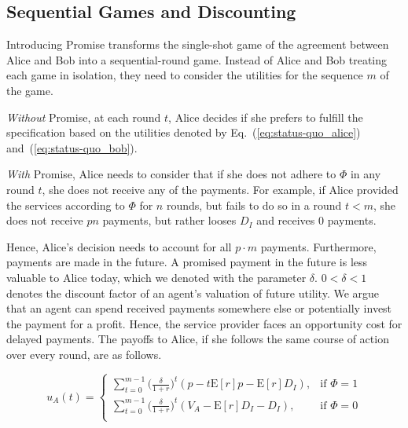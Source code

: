 \documentclass[runningheads]{llncs}
\newcommand{\sys}{Promise\xspace}
\newcommand{\rk}[1]{\todo[linecolor=red,backgroundcolor=red!25,bordercolor=blue,inline,caption={}]{Comment by Rami: #1}}
\begin{document}
\subsection{Sequential Games and Discounting}
Introducing \sys transforms the single-shot game of the agreement between Alice and Bob into a sequential-round game.
Instead of Alice and Bob treating each game in isolation, they need to consider the utilities for the sequence $m$ of the game.

\emph{Without} \sys, at each round $t$, Alice decides if she prefers to fulfill the specification based on the utilities denoted by Eq.~(\ref{eq:status-quo_alice}) and~(\ref{eq:status-quo_bob}).

\emph{With} \sys, Alice needs to consider that if she does not adhere to $\Phi$ in any round $t$, she does not receive any of the payments.
For example, if Alice provided the services according to $\Phi$ for $n$ rounds, but fails to do so in a round $t<m$, she does not receive $pn$ payments, but rather looses $D_I$ and receives $0$ payments.

Hence, Alice's decision needs to account for all $p \cdot m$ payments.
Furthermore, payments are made in the future.
A promised payment in the future is less valuable to Alice today, which we denoted with the parameter $\delta$.
$0<\delta<1$ denotes the discount factor of an agent's valuation of future utility. 
We argue that an agent can spend received payments somewhere else or potentially invest the payment for a profit.
Hence, the service provider faces an opportunity cost for delayed payments.
The payoffs to Alice, if she follows the same course of action over every round, are as follows. 

\begin{equation}
\label{eq:time_alice}
u_A(t) = 
\begin{cases}
    \sum_{t=0}^{m-1} \big( \frac{\delta}{1+r} \big)^{t} ( p - t\mathrm{E}[r]p -\mathrm{E}[r]D_{I}), & \text{if $\Phi=1$} \\
    \sum_{t=0}^{m-1} \big( \frac{\delta}{1+r} \big)^{t} (V_A - \mathrm{E}[r]D_{I}-D_{I}), & \text{if $\Phi=0$} \\
\end{cases}
\end{equation}
\end{document}
